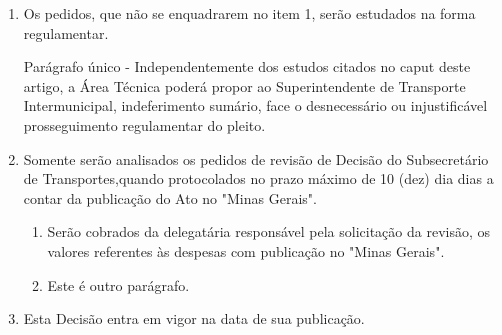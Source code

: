 \documentclass[a4paper,11pt]{report}
\begin{document}
\begin{enumerate}[label=Art. \arabic*]
\item \label{itm:DS3Z} Os pedidos, que não se enquadrarem no item 1, serão estudados na forma regulamentar.

Parágrafo único - Independentemente dos estudos citados no caput deste artigo, a Área Técnica poderá propor ao Superintendente de Transporte Intermunicipal, indeferimento sumário, face o desnecessário ou injustificável prosseguimento regulamentar do pleito.

\item \label{itm:N2VY} Somente serão analisados os pedidos de revisão de Decisão do Subsecretário de Transportes,quando protocolados no prazo máximo de 10 (dez) dia dias a contar da publicação do Ato no "Minas Gerais".
\begin{enumerate}[label= \S \arabic*]

\item Serão cobrados da delegatária responsável pela solicitação da revisão, os valores referentes às despesas com publicação no "Minas Gerais".

\item Este é outro parágrafo.
\end{enumerate}

\item \label{itm:9REB} Esta Decisão entra em vigor na data de sua publicação.

\end{enumerate}

\begin{center}
\Signatario

\CargoSignatario
\end{center}
\end{document}
